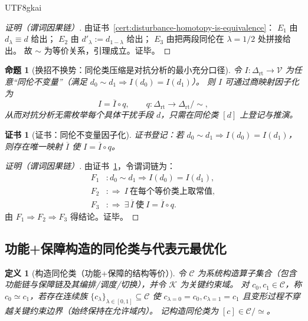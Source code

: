 \documentclass[12pt]{article}
\newtheorem{definition}{定义}[section]
\newtheorem{proposition}{命题}[section]
\newtheorem{Certificate}{证书}[section]
\newcommand{\DeltaRT}{\ensuremath{\Delta_{\mathrm{rt}}}}
\begin{document}
\begin{CJK*}{UTF8}{gkai}
\begin{proof}[证明（谓词因果链）]
由证书~\ref{cert:disturbance-homotopy-is-equivalence}：
$E_1$ 由 $d_\lambda\equiv d$ 给出；
$E_2$ 由 $d'_\lambda:=d_{1-\lambda}$ 给出；
$E_3$ 由把两段同伦在 $\lambda=1/2$ 处拼接给出。
故 $\sim$ 为等价关系，引理成立。证毕。
\end{proof}

\begin{proposition}[换招不换势：同伦类压缩是对抗分析的最小充分口径]
\label{prop:homotopy-class-compression}
令 $I:\DeltaRT\to \mathcal{V}$ 为任意“同伦不变量”（满足 $d_0\sim d_1\Rightarrow I(d_0)=I(d_1)$）。
则 $I$ 可通过商映射因子化为
\[
  I = \overline{I}\circ q,\qquad
  q:\DeltaRT\to \DeltaRT/\!\sim,
\]
从而对抗分析无需枚举每个具体干扰手段 $d$，只需在同伦类 $[d]$ 上登记与推演。
\end{proposition}

\begin{Certificate}[证书：同伦不变量因子化]
\label{cert:homotopy-class-compression}
证书登记：若 $d_0\sim d_1\Rightarrow I(d_0)=I(d_1)$，则存在唯一映射 $\overline{I}$ 使 $I=\overline{I}\circ q$。
\end{Certificate}

\begin{proof}[证明（谓词因果链）]
由证书~\ref{cert:homotopy-class-compression}，令谓词链为：
\[
\begin{aligned}
  F_1 &: d_0\sim d_1\Rightarrow I(d_0)=I(d_1),\\
  F_2 &: \Rightarrow\ I\ \text{在每个等价类上取常值},\\
  F_3 &: \Rightarrow\ \exists\,\overline{I}\ \text{使}\ I=\overline{I}\circ q.
\end{aligned}
\]
由 $F_1\Rightarrow F_2\Rightarrow F_3$ 得结论。证毕。
\end{proof}

\subsection{功能+保障构造的同伦类与代表元最优化}
\label{sec:construction-homotopy-and-representative-optimization}

\begin{definition}[构造同伦类（功能+保障的结构等价）]
令 $\mathcal{C}$ 为系统构造算子集合（包含功能链与保障链及其编排/调度/切换），并令 $\mathcal{K}$ 为关键约束域。
对 $c_0,c_1\in\mathcal{C}$，称 $c_0\simeq c_1$，若存在连续族 $\{c_\lambda\}_{\lambda\in[0,1]}\subseteq\mathcal{C}$ 使
$c_{\lambda=0}=c_0,c_{\lambda=1}=c_1$ 且变形过程不穿越关键约束边界（始终保持在允许域内）。
记构造同伦类为 $[c]\in \mathcal{C}/\!\simeq$。
\end{definition}


\end{CJK*}
\end{document}
